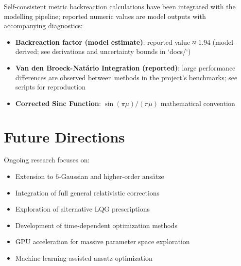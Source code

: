\documentclass[12pt]{article}
\begin{document}
Self-consistent metric backreaction calculations have been integrated with the modelling pipeline; reported numeric values are model outputs with accompanying diagnostics:
\begin{itemize}
\item \textbf{Backreaction factor (model estimate)}: reported value ≈ 1.94 (model-derived; see derivations and uncertainty bounds in `docs/`)
\item \textbf{Van den Broeck-Natário Integration (reported)}: large performance differences are observed between methods in the project's benchmarks; see scripts for reproduction
\item \textbf{Corrected Sinc Function}: $\sin(\pi\mu)/(\pi\mu)$ mathematical convention
\end{itemize}

\section{Future Directions}

Ongoing research focuses on:
\begin{itemize}
\item Extension to 6-Gaussian and higher-order ansätze
\item Integration of full general relativistic corrections
\item Exploration of alternative LQG prescriptions
\item Development of time-dependent optimization methods
\item GPU acceleration for massive parameter space exploration
\item Machine learning-assisted ansatz optimization
\end{itemize}
\end{document}
